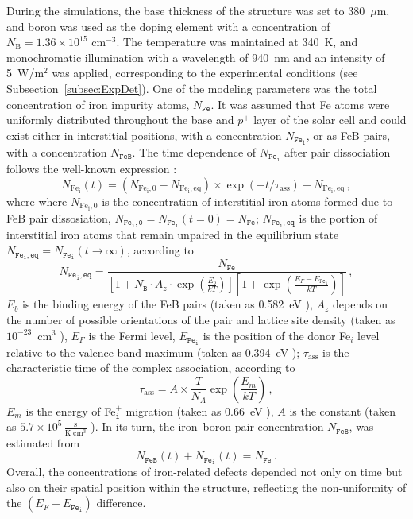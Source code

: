 \documentclass[10pt]{iopart}
\begin{document}
During the simulations, the base thickness of the structure was set to 380~$\mu$m,
and boron was used as the doping element with a concentration of $N_\mathrm{B} = 1.36 \times 10^{15}$ cm$^{-3}$.
The temperature was maintained at 340~K, and monochromatic illumination with a wavelength of  940~nm and an intensity of 5~W/m$^{2}$
was applied, corresponding to the experimental conditions (see Subsection~\ref{subsec:ExpDet}).
One of the modeling parameters was the total concentration of iron impurity atoms, $N_\mathtt{Fe}$.
It was assumed that Fe atoms were uniformly distributed throughout the base and $p^+$ layer of the solar cell
and could exist either in interstitial positions, with a concentration $N_\mathtt{Fe_i}$, or as FeB pairs, with a concentration $N_\mathtt{FeB}$.
The time dependence of $N_\mathtt{Fe_i}$ after pair dissociation follows the well-known expression \cite{MurphyJAP2011, Wijaranakula}:
\begin{equation}
\label{eqNFet}
N_\mathrm{Fe_i}(t)=(N_\mathrm{Fe_i,0}-N_\mathrm{Fe_i,eq})\times
\exp(-t/\tau_\mathrm{ass})+N_\mathrm{Fe_i,eq}\,,
\end{equation}
where
where $N_\mathrm{Fe_i,0}$ is the concentration of interstitial iron atoms formed due to FeB pair dissosiation,
$N_\mathtt{Fe_i,0} = N_\mathtt{Fe_i}(t=0) = N_\mathtt{Fe}$;
$N_\mathtt{Fe_i,eq}$ is the portion of interstitial iron atoms that remain unpaired in the equilibrium state
$N_\mathtt{Fe_i,eq}=N_\mathtt{Fe_i}(t \rightarrow \infty)$,
according to \cite{MurphyJAP2011, Wijaranakula}
\begin{equation}\label{eqFeieq}
  N_\mathtt{Fe_i,eq}=\frac{N_\mathtt{Fe}}{\left[1+N_\mathtt{B}\cdot A_z \cdot \exp\left(\frac{E_b}{kT}\right)\right]
  \left[1+\exp\left(\frac{E_F-E_\mathtt{Fe_i}}{kT}\right)\right]}\,,
\end{equation}
$E_b$ is the binding energy of the FeB pairs (taken as 0.582~eV \cite{Wijaranakula}),
$A_z $ depends on the number of possible orientations of the pair and lattice site density
(taken as $10^{-23}$~cm$^3$ \cite{MurphyJAP2011}),
$E_F$ is the Fermi level,
$E_\mathtt{Fe_i}$ is the position of the donor Fe$_i$ level relative to the valence band maximum
(taken as 0.394~eV \cite{FeBAssJAP2014});
$\tau_\mathrm{ass}$ is the characteristic time of the complex association,
according to \cite{FeBKin2019,FeBAssJAP2014,FeBAssSST2011}
\begin{equation}
\label{eqTass}
\tau_\mathrm{ass}=A\times\frac{T}{N_A}\exp\left(\frac{E_m}{kT}\right)\,,
\end{equation}
$E_m$ is the energy of Fe$_\mathtt{i}^+$ migration (taken as 0.66~eV \cite{FeBAssJAP2014,FeBKin2019,FeBAssSST2011}),
$A$ is the constant (taken as $5.7\times10^5\,\frac{\mathrm{s}}{\mathrm{K}\;\mathrm{cm}^3}$ \cite{FeBAssSST2011}).
In its turn, the iron–boron pair concentration $N_\mathtt{FeB}$, was estimated from
\begin{equation}\label{eqNFeB}
  N_\mathtt{FeB}(t)+N_\mathtt{Fe_i}(t)=N_\mathtt{Fe}\,.
\end{equation}
Overall, the concentrations of iron-related defects depended not only on time but
also on their spatial position within the structure, reflecting the non-uniformity of the $(E_F-E_\mathtt{Fe_i})$ difference.
\end{document}
